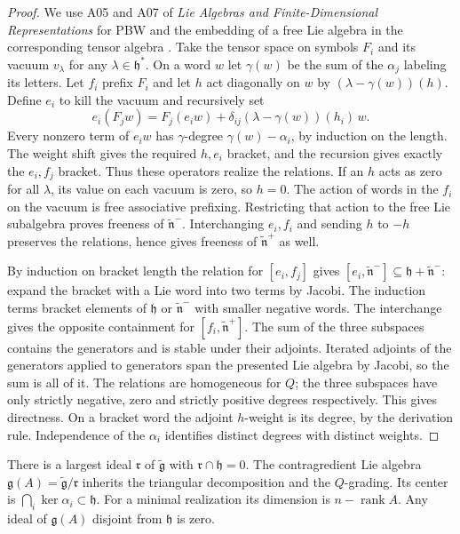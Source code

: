 \begin{proof}
We use A05 and A07 of \emph{Lie Algebras and Finite-Dimensional
Representations} for PBW and the embedding of a free Lie algebra
in the corresponding tensor algebra \cite[PDF pp.~8--9]{mg-lie}.
Take the tensor space on symbols \(F_i\) and its vacuum \(v_\lambda\)
for any \(\lambda\in\mathfrak h^*\). On a word \(w\) let
\(\gamma(w)\) be the sum of the \(\alpha_j\) labeling its letters.
Let \(f_i\) prefix \(F_i\) and let \(h\) act diagonally on \(w\) by
\((\lambda-\gamma(w))(h)\). Define \(e_i\) to kill the vacuum and
recursively set
\[
 e_i(F_j w)=F_j(e_i w)
               +\delta_{ij}(\lambda-\gamma(w))(h_i)\,w.
\]
Every nonzero term of \(e_i w\) has \(\gamma\)-degree
\(\gamma(w)-\alpha_i\), by induction on the length. The weight
shift gives the required \(h,e_i\) bracket, and the recursion
gives exactly the \(e_i,f_j\) bracket. Thus these operators realize
the relations. If an \(h\) acts as zero for all \(\lambda\), its value
on each vacuum is zero, so \(h=0\). The action of words in the
\(f_i\) on the vacuum is free associative prefixing. Restricting
that action to the free Lie subalgebra proves freeness of
\(\widetilde{\mathfrak n}^-\). Interchanging \(e_i,f_i\) and sending
\(h\) to \(-h\) preserves the relations, hence gives freeness of
\(\widetilde{\mathfrak n}^+\) as well.

By induction on bracket length the relation for \([e_i,f_j]\)
gives \([e_i,\widetilde{\mathfrak n}^-]\subseteq
\mathfrak h+\widetilde{\mathfrak n}^-\): expand the bracket with
a Lie word into two terms by Jacobi. The induction terms
bracket elements of \(\mathfrak h\) or \(\widetilde{\mathfrak n}^-\)
with smaller negative words. The interchange gives the opposite
containment for \([f_i,\widetilde{\mathfrak n}^+]\).
The sum of the three subspaces contains the generators and is stable
under their adjoints. Iterated adjoints of the generators applied to
generators span the presented Lie algebra by Jacobi, so the sum
is all of it. The relations are homogeneous for \(Q\); the three
subspaces have only strictly negative, zero and strictly positive
degrees respectively. This gives directness. On a bracket word
the adjoint \(h\)-weight is its degree, by the derivation rule.
Independence of the \(\alpha_i\) identifies distinct degrees
with distinct weights.
\end{proof}

\begin{theorem}
\label{res:KM04}
There is a largest ideal \(\mathfrak r\) of
\(\widetilde{\mathfrak g}\) with \(\mathfrak r\cap\mathfrak h=0\).
The contragredient Lie algebra
\(\mathfrak g(A)=\widetilde{\mathfrak g}/\mathfrak r\) inherits
the triangular decomposition and the \(Q\)-grading.
Its center is \(\bigcap_i\ker\alpha_i\subset\mathfrak h\).
For a minimal realization its dimension is
\(n-\operatorname{rank}A\). Any ideal of \(\mathfrak g(A)\)
disjoint from \(\mathfrak h\) is zero.
\end{theorem}

